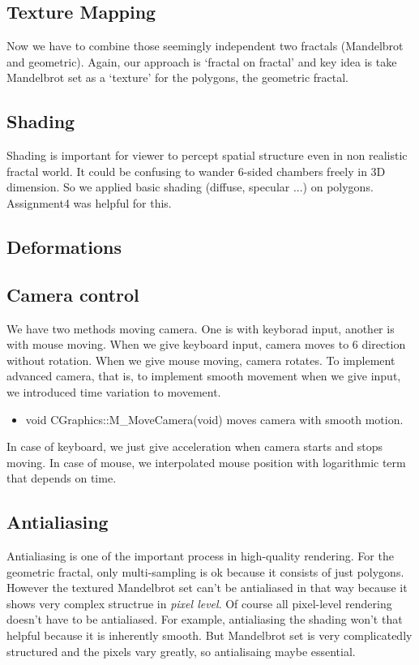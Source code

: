 \documentclass[a4paper]{article}
\begin{document}
\subsection{Texture Mapping}
Now we have to combine those seemingly independent two fractals (Mandelbrot and geometric).
Again, our approach is `fractal on fractal' and key idea is take Mandelbrot set as a `texture' for the polygons, the geometric fractal.



\subsection{Shading}
Shading is important for viewer to percept spatial structure even in non realistic fractal world.
It could be confusing to wander 6-sided chambers freely in 3D dimension.
So we applied basic shading (diffuse, specular ...) on polygons.
Assignment4 was helpful for this.

\subsection{Deformations}

\subsection{Camera control}
We have two methods moving camera. One is with keyborad input, another is with mouse moving. When we give keyboard input, camera moves to 6 direction without rotation. When we give mouse moving, camera rotates. To implement advanced camera, that is, to implement smooth movement when we give input, we introduced time variation to movement.
\begin{itemize}
  \item void CGraphics::M\_MoveCamera(void) moves camera with smooth motion.
\end{itemize}

In case of keyboard, we just give acceleration when camera starts and stops moving. In case of mouse, we interpolated mouse position with logarithmic term that depends on time.

\subsection{Antialiasing}
Antialiasing is one of the important process in high-quality rendering.
For the geometric fractal, only multi-sampling is ok because it consists of just polygons.
However the textured Mandelbrot set can't be antialiased in that way because it shows very complex structrue in \textit{pixel level}.
Of course all pixel-level rendering doesn't have to be antialiased.
For example, antialiasing the shading won't that helpful because it is inherently smooth.
But Mandelbrot set is very complicatedly structured and the pixels vary greatly, so antialisaing maybe essential.
\end{document}
